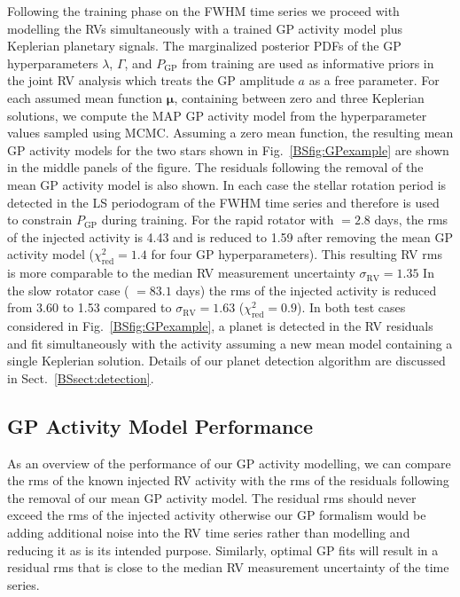 Following the training phase on the FWHM time series
we proceed with modelling the RVs simultaneously with a trained GP activity model plus Keplerian planetary
signals. The marginalized posterior PDFs of the GP hyperparameters $\lambda$, $\Gamma$, and $P_{\text{GP}}$
from training are used as informative priors in the joint RV analysis which treats the GP amplitude
$a$ as a free parameter. For each assumed mean function $\boldsymbol{\mu}$, containing between zero and three
Keplerian solutions, we compute the MAP GP activity model from the hyperparameter values sampled using MCMC.
Assuming a zero mean function, the resulting mean GP activity models
for the two stars shown in Fig.~\ref{BSfig:GPexample} are shown in the middle panels of the figure. The residuals
following the removal of the mean GP activity model is also shown. In each case the stellar rotation period is
detected in the LS periodogram of the FWHM time series and therefore is used to constrain $P_{\text{GP}}$ during
training. For the rapid rotator with \prot{} $=2.8$ days, the rms of the injected activity is 4.43 \mps{} and
is reduced to 1.59 \mps{} after removing the mean GP activity model ($\chi_{\text{red}}^2 =1.4$ for four GP hyperparameters).
This resulting RV rms is more comparable
to the median RV measurement uncertainty $\sigma_{\text{RV}}=1.35$  In the slow rotator case (\prot{} $=83.1$ days)
the rms of the injected activity is reduced from 3.60 \mps{} to 1.53 \mps{} compared to
$\sigma_{\text{RV}}=1.63$ \mps{} ($\chi_{\text{red}}^2 =0.9$). In both test cases considered in
Fig.~\ref{BSfig:GPexample}, a planet is detected in the RV residuals and fit simultaneously with the activity assuming
a new mean model containing a single Keplerian solution. Details of our planet detection algorithm are discussed in
Sect.~\ref{BSsect:detection}.


\subsection{GP Activity Model Performance}
As an overview of the performance of our GP activity modelling, we can compare the rms of the known
injected RV activity with the rms of the residuals following the removal of our mean GP activity model. The residual
rms should never exceed the rms of the injected activity otherwise our GP formalism would be adding additional noise
into the RV time series rather than modelling and reducing it as is its intended purpose. Similarly, optimal GP fits
will result in a residual rms that is close to the median RV measurement uncertainty of the time series. \\

